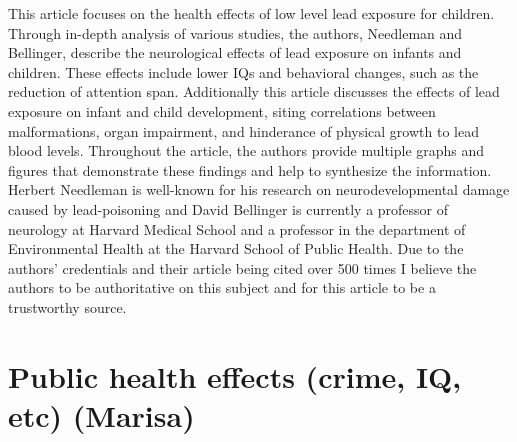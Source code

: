 \documentclass{article}\usepackage[]{graphicx}\usepackage[]{color}
\begin{document}
This article focuses on the health effects of low level lead exposure for children. Through in-depth analysis of various studies, the authors, Needleman and Bellinger, describe the neurological effects of lead exposure on infants and children. These effects include lower IQs and behavioral changes, such as the reduction of attention span. Additionally this article discusses the effects of lead exposure on infant and child development, siting correlations between malformations, organ impairment, and hinderance of physical growth to lead blood levels. Throughout the article, the authors provide multiple graphs and figures that demonstrate these findings and help to synthesize the information. Herbert Needleman is well-known for his research on neurodevelopmental damage caused by lead-poisoning and David Bellinger is currently a professor of neurology at Harvard Medical School and a professor in the department of Environmental Health at the Harvard School of Public Health. Due to the authors’ credentials and their article being cited over 500 times I believe the authors to be authoritative on this subject and for this article to be a trustworthy source. 




\section{Public health effects (crime, IQ, etc) (Marisa)}
\end{document}
